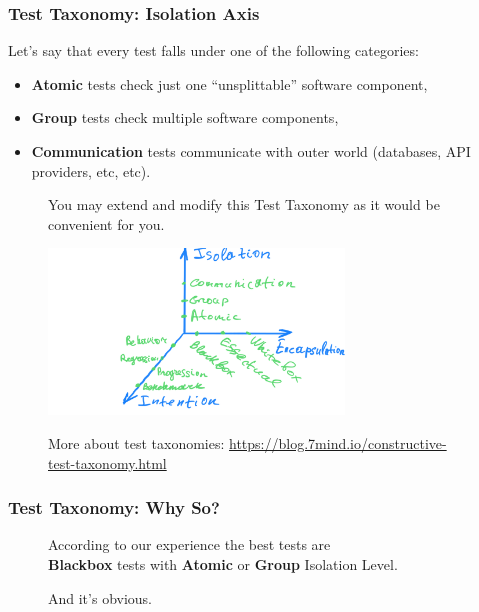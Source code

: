 \documentclass[usenames,dvipsnames,aspectratio=169]{beamer}
\begin{document}
\begin{frame}
  \frametitle{Test Taxonomy: Isolation Axis}
  Let's say that every test falls under one of the following categories:

  \begin{itemize}
    \item \textbf{Atomic} tests check just one ``unsplittable'' software component,
    \item \textbf{Group} tests check multiple software components,
    \item \textbf{Communication} tests communicate with outer world (databases, API providers, etc, etc).
  \end{itemize}
\end{frame}

\begin{frame}
  \begin{figure}
  \large You may extend and modify this Test Taxonomy as it would be convenient for you.
  \end{figure}

  \begin{figure}
    \includegraphics[width=0.7\textwidth]{media/ctt.png}
  \end{figure}

  \begin{figure}
  More about test taxonomies: \url{https://blog.7mind.io/constructive-test-taxonomy.html}
  \end{figure}
\end{frame}


\begin{frame}
  \frametitle{Test Taxonomy: Why So?}
  \begin{figure}
    According to our experience the best tests are \\
     \textbf{Blackbox} tests with \textbf{Atomic} or \textbf{Group} Isolation Level.
  \end{figure}
  \begin{figure}
    And it's obvious.
  \end{figure}
\end{frame}
\end{document}
